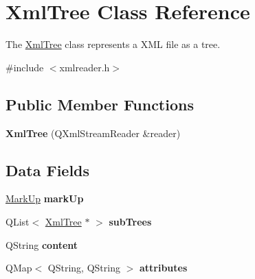 \hypertarget{class_xml_tree}{\section{\-Xml\-Tree \-Class \-Reference}
\label{class_xml_tree}
}


\-The \hyperlink{class_xml_tree}{\-Xml\-Tree} class represents a \-X\-M\-L file as a tree.  




{\ttfamily \#include $<$xmlreader.\-h$>$}

\subsection*{\-Public \-Member \-Functions}
\begin{DoxyCompactItemize}
\item 
\hypertarget{class_xml_tree_a40711bfd0fc7794d925d12846dae730a}{{\bfseries \-Xml\-Tree} (\-Q\-Xml\-Stream\-Reader \&reader)}\label{class_xml_tree_a40711bfd0fc7794d925d12846dae730a}

\end{DoxyCompactItemize}
\subsection*{\-Data \-Fields}
\begin{DoxyCompactItemize}
\item 
\hypertarget{class_xml_tree_a9fd3e34454a3767e60fe1c03eb8b04ce}{\hyperlink{xmlreader_8h_a8ebc4822e749407b36d68d18ee0af242}{\-Mark\-Up} {\bfseries mark\-Up}}\label{class_xml_tree_a9fd3e34454a3767e60fe1c03eb8b04ce}

\item 
\hypertarget{class_xml_tree_a2e5c80cbf2a4bf869f738a3919801160}{\-Q\-List$<$ \hyperlink{class_xml_tree}{\-Xml\-Tree} $\ast$ $>$ {\bfseries sub\-Trees}}\label{class_xml_tree_a2e5c80cbf2a4bf869f738a3919801160}

\item 
\hypertarget{class_xml_tree_a3c27d16f3b12a284bebb4757baf1b1be}{\-Q\-String {\bfseries content}}\label{class_xml_tree_a3c27d16f3b12a284bebb4757baf1b1be}

\item 
\hypertarget{class_xml_tree_a2b781884831528cf548989ddb77d50e5}{\-Q\-Map$<$ \-Q\-String, \-Q\-String $>$ {\bfseries attributes}}\label{class_xml_tree_a2b781884831528cf548989ddb77d50e5}

\end{DoxyCompactItemize}


